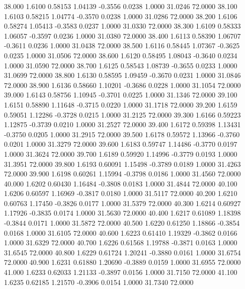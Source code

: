  38.000   1.6100   0.58153   1.04139  -0.3556   0.0238   1.0000  31.0246  72.0000
  38.100   1.6103   0.58215   1.04774  -0.3570   0.0238   1.0000  31.0286  72.0000
  38.200   1.6106   0.58274   1.05413  -0.3583   0.0237   1.0000  31.0330  72.0000
  38.300   1.6109   0.58333   1.06057  -0.3597   0.0236   1.0000  31.0380  72.0000
  38.400   1.6113   0.58390   1.06707  -0.3611   0.0236   1.0000  31.0438  72.0000
  38.500   1.6116   0.58445   1.07367  -0.3625   0.0235   1.0000  31.0506  72.0000
  38.600   1.6120   0.58495   1.08043  -0.3640   0.0234   1.0000  31.0590  72.0000
  38.700   1.6125   0.58543   1.08739  -0.3655   0.0233   1.0000  31.0699  72.0000
  38.800   1.6130   0.58595   1.09459  -0.3670   0.0231   1.0000  31.0846  72.0000
  38.900   1.6136   0.58660   1.10201  -0.3686   0.0228   1.0000  31.1054  72.0000
  39.000   1.6143   0.58756   1.10945  -0.3701   0.0225   1.0000  31.1346  72.0000
  39.100   1.6151   0.58890   1.11648  -0.3715   0.0220   1.0000  31.1718  72.0000
  39.200   1.6159   0.59051   1.12286  -0.3728   0.0215   1.0000  31.2125  72.0000
  39.300   1.6166   0.59223   1.12875  -0.3739   0.0210   1.0000  31.2527  72.0000
  39.400   1.6172   0.59398   1.13431  -0.3750   0.0205   1.0000  31.2915  72.0000
  39.500   1.6178   0.59572   1.13966  -0.3760   0.0201   1.0000  31.3279  72.0000
  39.600   1.6183   0.59747   1.14486  -0.3770   0.0197   1.0000  31.3624  72.0000
  39.700   1.6189   0.59920   1.14996  -0.3779   0.0193   1.0000  31.3951  72.0000
  39.800   1.6193   0.60091   1.15498  -0.3789   0.0189   1.0000  31.4263  72.0000
  39.900   1.6198   0.60261   1.15994  -0.3798   0.0186   1.0000  31.4560  72.0000
  40.000   1.6202   0.60430   1.16484  -0.3808   0.0183   1.0000  31.4844  72.0000
  40.100   1.6206   0.60597   1.16969  -0.3817   0.0180   1.0000  31.5117  72.0000
  40.200   1.6210   0.60763   1.17450  -0.3826   0.0177   1.0000  31.5379  72.0000
  40.300   1.6214   0.60927   1.17926  -0.3835   0.0174   1.0000  31.5630  72.0000
  40.400   1.6217   0.61089   1.18398  -0.3844   0.0171   1.0000  31.5872  72.0000
  40.500   1.6220   0.61250   1.18866  -0.3854   0.0168   1.0000  31.6105  72.0000
  40.600   1.6223   0.61410   1.19329  -0.3862   0.0166   1.0000  31.6329  72.0000
  40.700   1.6226   0.61568   1.19788  -0.3871   0.0163   1.0000  31.6545  72.0000
  40.800   1.6229   0.61724   1.20241  -0.3880   0.0161   1.0000  31.6754  72.0000
  40.900   1.6231   0.61880   1.20690  -0.3889   0.0159   1.0000  31.6955  72.0000
  41.000   1.6233   0.62033   1.21133  -0.3897   0.0156   1.0000  31.7150  72.0000
  41.100   1.6235   0.62185   1.21570  -0.3906   0.0154   1.0000  31.7340  72.0000
